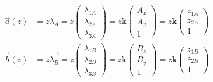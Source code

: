{\large
\begin{align}\label{eq:2_1}
    \vec{a}(z) &= z \vec{\lambda_A} = z \! 
    \begin{pmatrix}
        \lambda_{1A}\\ 
        \lambda_{2A}\\ 
        \lambda_{3A}
    \end{pmatrix} = z\bm{k}
    \begin{pmatrix}
        A_x\\ 
        A_y\\
        1
    \end{pmatrix} = z\bm{k}
    \begin{pmatrix}
        z_{1A}\\ 
        z_{2A}\\
        1
    \end{pmatrix}\\[10pt]
    \vec{b}(z) &= z \vec{\lambda_B} = z \! 
    \begin{pmatrix}
        \lambda_{1B}\\ 
        \lambda_{2B}\\
        \lambda_{3B}
    \end{pmatrix} = z\bm{k}
    \begin{pmatrix}
        B_x\\ 
        B_y\\
        1
    \end{pmatrix}= z\bm{k}
    \begin{pmatrix}
        z_{1B}\\ 
        z_{2B}\\
        1
    \end{pmatrix}\label{eq:2_2}
\end{align}
}

